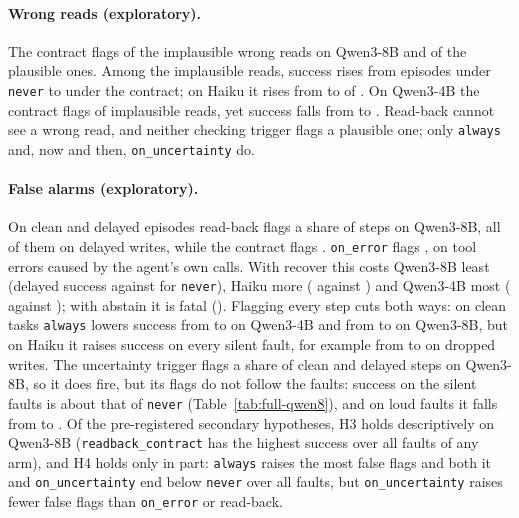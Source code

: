 \paragraph{Wrong reads (exploratory).} The contract flags \RExpQwenEightByKindContractImplausibleFlagged{} of the
\RExpQwenEightByKindContractImplausibleN{} implausible wrong reads on Qwen3-8B and \RExpQwenEightByKindContractPlausibleFlagged{} of
the \RExpQwenEightByKindContractPlausibleN{} plausible ones. Among the implausible reads, success
rises from \RExpQwenEightByKindNeverImplausibleSuccess{} episodes under \texttt{never} to
\RExpQwenEightByKindContractImplausibleSuccess{} under the contract; on Haiku it rises from
\RExpHaikuByKindNeverImplausibleSuccess{} to \RExpHaikuByKindContractImplausibleSuccess{} of
\RExpHaikuByKindContractImplausibleN{}. On Qwen3-4B the contract flags
\RExpQwenFourByKindContractImplausibleFlagged{} of \RExpQwenFourByKindContractImplausibleN{} implausible
reads, yet success falls from \RExpQwenFourByKindNeverImplausibleSuccess{} to
\RExpQwenFourByKindContractImplausibleSuccess{}. Read-back cannot see a wrong read, and
neither checking trigger flags a plausible one; only \texttt{always} and, now and then,
\texttt{on\_uncertainty} do.

\paragraph{False alarms (exploratory).} On clean and delayed episodes read-back flags a share
\RExpQwenEightFlagReadback{} of steps on Qwen3-8B, all of them on delayed writes, while the contract
flags \RExpQwenEightFlagContract{}. \texttt{on\_error} flags \RExpQwenEightFlagOnError{}, on tool errors caused by the agent's own
calls. With recover this costs Qwen3-8B least (delayed success
\RQwenEightDelayedReadbackSuccess{} against \RQwenEightDelayedNeverSuccess{} for \texttt{never}), Haiku
more (\RHaikuDelayedReadbackSuccess{} against \RHaikuDelayedNeverSuccess{}) and Qwen3-4B most
(\RQwenFourDelayedReadbackSuccess{} against \RQwenFourDelayedNeverSuccess{}); with abstain it is fatal
(\RQwenEightDelayedReadbackAbstainSuccess{}). Flagging every step cuts both ways: on clean tasks
\texttt{always} lowers success from \RQwenFourCleanNeverSuccess{} to \RQwenFourCleanAlwaysSuccess{} on
Qwen3-4B and from \RQwenEightCleanNeverSuccess{} to \RQwenEightCleanAlwaysSuccess{} on Qwen3-8B, but on
Haiku it raises success on every silent fault, for example from \RHaikuDropNeverSuccess{} to
\RHaikuDropAlwaysSuccess{} on dropped writes. The uncertainty trigger flags a share
\RExpQwenEightFlagOnUnc{} of clean and delayed steps on Qwen3-8B, so it does fire, but its flags do
not follow the faults: success on the silent faults is about that of \texttt{never}
(Table~\ref{tab:full-qwen8}), and on loud faults it falls from \RQwenEightLoudNeverSuccess{} to
\RQwenEightLoudOnUncSuccess{}. Of the pre-registered secondary hypotheses, H3 holds descriptively on
Qwen3-8B (\texttt{readback\_contract} has the highest success over all faults of any arm), and H4 holds
only in part: \texttt{always} raises the most false flags and both it and \texttt{on\_uncertainty} end
below \texttt{never} over all faults, but \texttt{on\_uncertainty} raises fewer false flags than
\texttt{on\_error} or read-back.
